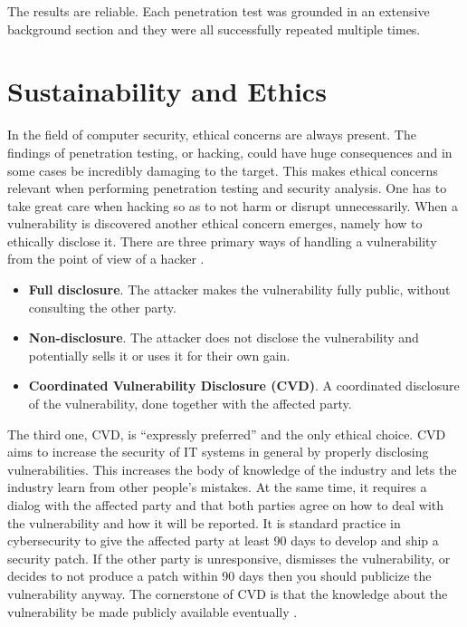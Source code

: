 The results are reliable. Each penetration test was grounded in an extensive background section and they were all successfully repeated multiple times.

\section{Sustainability and Ethics}
In the field of computer security, ethical concerns are always present. The findings of penetration testing, or hacking, could have huge consequences and in some cases be incredibly damaging to the target. This makes ethical concerns relevant when performing penetration testing and security analysis. One has to take great care when hacking so as to not harm or disrupt unnecessarily. When a vulnerability is discovered another ethical concern emerges, namely how to ethically disclose it. There are three primary ways of handling a vulnerability from the point of view of a hacker \cite{disclosure-guideline}.
\begin{itemize}
    \item \textbf{Full disclosure}. The attacker makes the vulnerability fully public, without consulting the other party.
    \item \textbf{Non-disclosure}. The attacker does not disclose the vulnerability and potentially sells it or uses it for their own gain.
    \item \textbf{Coordinated Vulnerability Disclosure (CVD)}. A coordinated disclosure of the vulnerability, done together with the affected party.
\end{itemize}
The third one, CVD, is \enquote{expressly preferred} \cite{disclosure-guideline} and the only ethical choice. CVD aims to increase the security of IT systems in general by properly disclosing vulnerabilities. This increases the body of knowledge of the industry and lets the industry learn from other people's mistakes. At the same time, it requires a dialog with the affected party and that both parties agree on how to deal with the vulnerability and how it will be reported. It is standard practice in cybersecurity to give the affected party at least 90 days to develop and ship a security patch. If the other party is unresponsive, dismisses the vulnerability, or decides to not produce a patch within 90 days then you should publicize the vulnerability anyway. The cornerstone of CVD is that the knowledge about the vulnerability be made publicly available eventually \cite{disclosure-guideline}.

